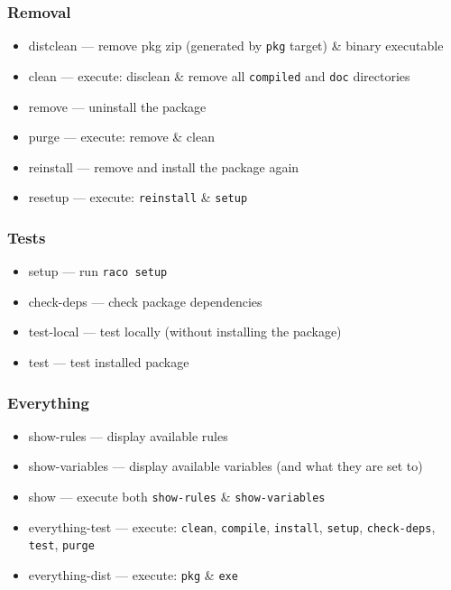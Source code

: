 \documentclass{article}
\newcommand{\postDoc}{}
\newcommand{\Scribtexttt}[1]{{\texttt{#1}}}
\newlength{\stabLeft}
\newcommand{\atItemizeStart}[0]{\addtolength{\stabLeft}{\labelsep}
                                \addtolength{\stabLeft}{\labelwidth}}
\newcommand{\Ssubsubsection}[2]{\subsubsection[#1]{#2}}
\begin{document}
\Ssubsubsection{Removal}{Removal}\label{t:x28part_x22Removalx22x29}

\begin{itemize}\atItemizeStart

\item distclean {---} remove pkg zip (generated by \Scribtexttt{pkg} target)
\& binary executable

\item clean {---} execute: disclean \& remove all \Scribtexttt{compiled}
and \Scribtexttt{doc} directories

\item remove {---} uninstall the package

\item purge {---} execute: remove \& clean

\item reinstall {---} remove and install the package again

\item resetup {---} execute: \Scribtexttt{reinstall} \& \Scribtexttt{setup}\end{itemize}

\Ssubsubsection{Tests}{Tests}\label{t:x28part_x22Testsx22x29}

\begin{itemize}\atItemizeStart

\item setup {---} run \Scribtexttt{raco setup}

\item check{-}deps {---} check package dependencies

\item test{-}local {---} test locally (without installing the package)

\item test {---} test installed package\end{itemize}

\Ssubsubsection{Everything}{Everything}\label{t:x28part_x22Everythingx22x29}

\begin{itemize}\atItemizeStart

\item show{-}rules {---} display available rules

\item show{-}variables
{---} display available variables (and what they are set to)

\item show {---} execute both \Scribtexttt{show{-}rules} \& \Scribtexttt{show{-}variables}

\item everything{-}test {---} execute:
\Scribtexttt{clean}, \Scribtexttt{compile}, \Scribtexttt{install}, \Scribtexttt{setup},
\Scribtexttt{check{-}deps}, \Scribtexttt{test}, \Scribtexttt{purge}

\item everything{-}dist {---} execute: \Scribtexttt{pkg} \& \Scribtexttt{exe}\end{itemize}

\postDoc
\end{document}
